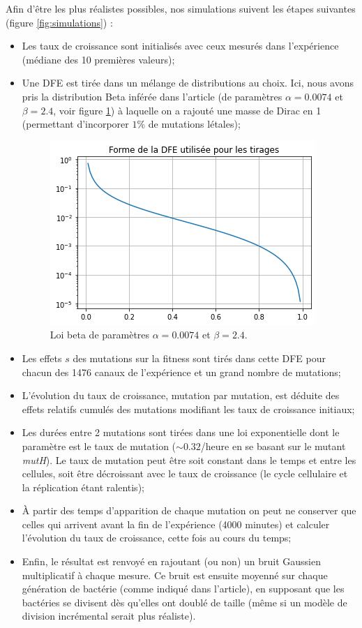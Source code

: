 \documentclass[12pt]{article}
\begin{document}
Afin d'être les plus réalistes possibles, nos simulations suivent les étapes suivantes (figure \ref{fig:simulations}) :
\begin{itemize}
\item Les taux de croissance sont initialisés avec ceux mesurés dans l'expérience (médiane des 10 premières valeurs);
\item Une DFE est tirée dans un mélange de distributions au choix. Ici, nous avons pris la distribution Beta inférée dans l'article (de paramètres $\alpha=0.0074$ et $\beta=2.4$, voir figure \ref{fig:lbeta}) à laquelle on a rajouté une masse de Dirac en 1 (permettant d'incorporer $1\%$ de mutations létales);
  \begin{figure}[h]
    \begin{center}
      \includegraphics[scale=0.65]{./img/lbeta.png}
    \end{center} 
    \caption{\label{fig:lbeta}Loi beta de paramètres $\alpha=0.0074$ et $\beta=2.4$.}
  \end{figure}
\item Les effets $s$ des mutations sur la fitness sont tirés dans cette DFE pour chacun des 1476 canaux de l'expérience et un grand nombre de mutations;
\item L'évolution du taux de croissance, mutation par mutation, est déduite des effets relatifs cumulés des mutations modifiant les taux de croissance initiaux;
\item Les durées entre 2 mutations sont tirées dans une loi exponentielle dont le paramètre est le taux de mutation ($\sim0.32$/heure en se basant sur le mutant \emph{mutH}). Le taux de mutation peut être soit constant dans le temps et entre les cellules, soit être décroissant avec le taux de croissance (le cycle cellulaire et la réplication étant ralentis);
\item À partir des temps d'apparition de chaque mutation on peut ne conserver que celles qui arrivent avant la fin de l'expérience (4000 minutes) et calculer l'évolution du taux de croissance, cette fois au cours du temps;
\item Enfin, le résultat est renvoyé en rajoutant (ou non) un bruit Gaussien multiplicatif à chaque mesure. Ce bruit est ensuite moyenné sur chaque génération de bactérie (comme indiqué dans l'article), en supposant que les bactéries se divisent dès qu'elles ont doublé de taille (même si un modèle de division incrémental serait plus réaliste).
\end{itemize}
\end{document}
